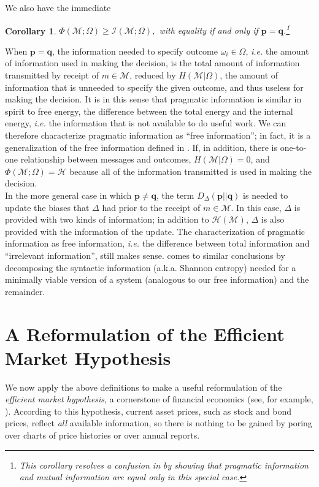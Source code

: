\documentclass[11pt]{article}
\newtheorem*{corollary}{Corollary}
\begin{document}
We also have the immediate
\begin{corollary}
$
\Phi (\mathcal M; \Omega) \geq \mathcal I (\mathcal M; \Omega),
$
with equality if and only if $\mathbf p = \mathbf q$.\footnote{This corollary resolves a confusion in \cite{Weinberger02}
by showing that pragmatic information and mutual information are equal only in this special case.}
\end{corollary} 

When $\mathbf p = \mathbf q$, the information needed to specify outcome $\omega_i \in \Omega$, {\it i.e.} the amount of information used in making the decision, is 
the total amount of information transmitted by receipt of $m \in \mathcal M$, reduced by $H (\mathcal M| \Omega)$, the amount of information that is unneeded to specify the given outcome,
and thus useless for making the decision.  It is in this sense that pragmatic information is similar in spirit to free energy, the difference between the total energy and the internal energy, {\it i.e.} the information that is 
not available to do useful work.  We can therefore characterize pragmatic information as ``free information''; in fact, it is a generalization of the free information defined in \cite{Crutchfield}.
If, in addition, there is one-to-one relationship between messages and outcomes, $H (\mathcal M| \Omega) = 0$, and $\Phi (\mathcal M; \Omega) = \mathcal H$ 
because all of the information transmitted is used in making the decision. \\

In the more general case in which $\mathbf p \neq \mathbf q$, the term $D_\Delta(\mathbf p || \mathbf q)$ is needed to
update the biases that $\Delta$ had prior to the receipt of $m \in \mathcal M$.  In this case, $\Delta$ is provided with two kinds of information; in addition to $\mathcal H(\mathcal M)$, $\Delta$
is also provided with the information of the update.  The characterization of pragmatic information as free information, {\it i.e.} the difference between total information and ``irrelevant information'',
still makes sense. \cite{Wolpert} comes to similar conclusions by decomposing the syntactic information 
(a.k.a. Shannon entropy) needed for a minimally viable version of a system (analogous to our free information)
and the remainder.
\\

\section{A Reformulation of the Efficient Market Hypothesis}
We now apply the above definitions to make a useful reformulation of the {\it efficient market hypothesis}, a cornerstone of financial economics (see, for example, \cite{Fama}).  According to this hypothesis, current
asset prices, such as stock and bond prices, reflect {\it all} available information, so there is nothing to be gained by poring over charts of price histories or over annual reports.\\
 
\end{document}
